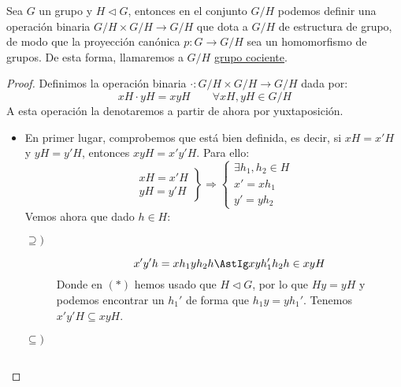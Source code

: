 \begin{teo}\label{teo:grupo_cociente}
    Sea $G$ un grupo y $H\lhd G$, entonces en el conjunto $G/H$ podemos definir una operación binaria $G/H\times G/H\longrightarrow G/H$ que dota a $G/H$ de estructura de grupo, de modo que la proyección canónica $p:G\to G/H$ sea un homomorfismo de grupos. De esta forma, llamaremos a $G/H$ \underline{grupo cociente}.
    \begin{proof}
        Definimos la operación binaria $\cdot: G/H\times G/H\longrightarrow G/H$ dada por:
        \begin{equation*}
            xH\cdot yH = xyH \qquad \forall xH,yH\in G/H
        \end{equation*}
        A esta operación la denotaremos a partir de ahora por yuxtaposición.
        \begin{itemize}
            \item En primer lugar, comprobemos que está bien definida, es decir, si $xH = x'H$ y $yH=y'H$, entonces $xyH = x'y'H$. Para ello:
                \begin{equation*}
                    \left.\begin{array}{l}
                        xH = x'H \\
                        yH = y'H
                    \end{array}\right\} \Longrightarrow \left\{\begin{array}{l}
                        \exists h_1,h_2\in H \\
                        x'= xh_1 \\
                        y' = yh_2 
                    \end{array}\right.
                \end{equation*}
                Vemos ahora que dado $h\in H$:
                \begin{description}
                    \item [$\supseteq)$] 
                        \begin{equation*}
                            x'y'h = xh_1yh_2h \AstIg xyh_1'h_2h \in xyH
                        \end{equation*}
                        Donde en $(\ast)$ hemos usado que $H\lhd G$, por lo que $Hy=yH$ y podemos encontrar un $h_1'$ de forma que $h_1y = yh_1'$. Tenemos $x'y'H\subseteq xyH$. 
                    \item [$\subseteq)$] 
                        \begin{equation*}

\end{equation*}
\end{description}
\end{itemize}
\end{proof}
\end{teo}
